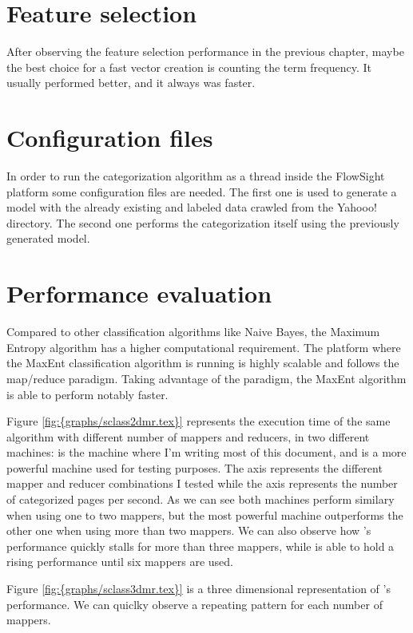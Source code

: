   

\section{Feature selection}
After observing the feature selection performance in the previous chapter, maybe the best choice for a fast vector creation is counting the term frequency. It usually performed better, and it always
was faster.

\section{Configuration files}
In order to run the categorization algorithm as a thread inside the FlowSight platform some configuration files are needed. The first one is used to generate a model with the already existing and labeled
data crawled from the Yahooo! directory. The second one performs the categorization itself using the previously generated model.




\section{Performance evaluation}
Compared to other classification algorithms like Naive Bayes, the Maximum Entropy algorithm has a higher computational requirement. 
The platform where the MaxEnt classification algorithm is running is highly scalable and follows the map/reduce paradigm. Taking advantage of the paradigm, the MaxEnt algorithm
is able to perform notably faster.



Figure \ref{fig:{graphs/sclass2dmr.tex}} represents the execution time of the same algorithm with different number of mappers and reducers, in two different machines:  
is the machine where I'm writing most of this document, and  is a more powerful machine used for testing purposes. The  axis represents the 
different mapper and reducer combinations I tested while the  axis represents the number of categorized pages per second.
As we can see both machines perform similary when using one to two mappers, but the most powerful machine outperforms the other one when using more than two mappers. We can also observe how 's performance
quickly stalls for more than three mappers, while  is able to hold a rising performance until six mappers are used.

Figure \ref{fig:{graphs/sclass3dmr.tex}} is a three dimensional representation of 's performance. We can quiclky observe a repeating pattern for each number of mappers.

